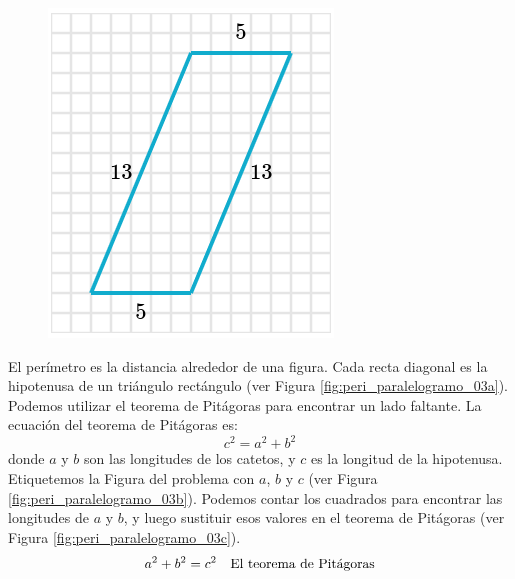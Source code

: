 \begin{solutionbox}{14cm}
\begin{minipage}{0.4\textwidth}
\begin{multicols}{2}
\begin{figure}[H]
                \includegraphics[width=0.9\linewidth]{../images/peri_paralelogramo_03d.png}
                \caption{}
                \label{fig:peri_paralelogramo_03d}
            \end{figure}
        \end{multicols}
    \end{minipage}\hfill
    \begin{minipage}{0.55\textwidth}
        El perímetro es la distancia alrededor de una figura.
        Cada recta diagonal es la hipotenusa de un triángulo rectángulo (ver Figura \ref{fig:peri_paralelogramo_03a}).
        Podemos utilizar el teorema de Pitágoras para encontrar un lado faltante.
        La ecuación del teorema de Pitágoras es:
        \[c^2=a^2+b^2\]
        donde $a$ y $b$ son las longitudes de los catetos, y $c$ es la longitud de la hipotenusa.
        Etiquetemos la Figura del problema con $a$, $b$ y $c$ (ver Figura \ref{fig:peri_paralelogramo_03b}).
        Podemos contar los cuadrados para encontrar las longitudes de $a$ y $b$, y luego sustituir esos valores en el teorema de Pitágoras (ver Figura \ref{fig:peri_paralelogramo_03c}).
        \begin{align*}
            a^2+b^2  =c^2  & \text{\quad El teorema de Pitágoras}                          \\

\end{align*}
\end{minipage}
\end{solutionbox}
